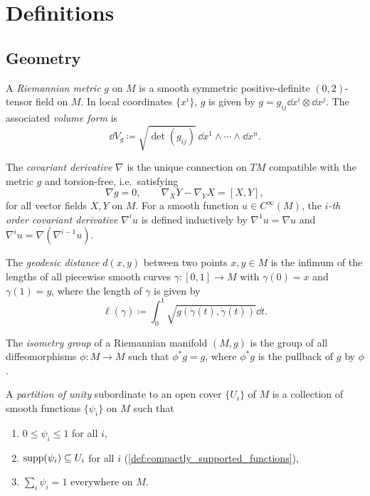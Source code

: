 \section{Definitions}

\subsection{Geometry}

\begin{definition}
  A \emph{Riemannian metric} $g$ on $M$ is a smooth symmetric positive-definite $(0,2)$-tensor field on $M$. In local coordinates $\{x^i\}$, $g$ is given by $g = g_{ij} \dd{x^i} \otimes \dd{x^j}$. The associated \emph{volume form} is
  \[%
    \dd{V}_g \coloneqq \sqrt{\det(g_{ij})} \, \dd{x^1} \wedge \cdots \wedge \dd{x^n}
  .\]%
\end{definition}

\begin{definition}
  The \emph{covariant derivative} $\nabla$ is the unique connection on $TM$ compatible with the metric $g$ and torsion-free, i.e.\ satisfying
  \[%
    \nabla g = 0, \qquad \nabla_X Y - \nabla_Y X = [X, Y]
  ,\]%
  for all vector fields $X, Y$ on $M$. For a smooth function $u \in C^\infty(M)$, the \emph{$i$-th order covariant derivative} $\nabla^i u$ is defined inductively by $\nabla^1 u = \nabla u$ and $\nabla^i u = \nabla(\nabla^{i-1} u)$.
\end{definition}

\begin{definition}
  The \emph{geodesic distance} $d(x, y)$ between two points $x, y \in M$ is the infimum of the lengths of all piecewise smooth curves $\gamma : [0, 1] \to M$ with $\gamma(0) = x$ and $\gamma(1) = y$, where the length of $\gamma$ is given by
  \[%
    \ell(\gamma) \coloneqq \int_0^1 \sqrt{g(\dot\gamma(t), \dot\gamma(t))} \dd{t}
  .\]%
\end{definition}

\begin{definition}
  The \emph{isometry group} of a Riemannian manifold $(M, g)$ is the group of all diffeomorphisms $\phi : M \to M$ such that $\phi^*g = g$, where $\phi^*g$ is the pullback of $g$ by $\phi$.
\end{definition}

\begin{definition}
  A \emph{partition of unity} subordinate to an open cover $\{U_i\}$ of $M$ is a collection of smooth functions $\{\psi_i\}$ on $M$ such that
  \begin{enumerate}
    \item $0 \le \psi_i \le 1$ for all $i$,
    \item $\operatorname{supp}(\psi_i) \subseteq U_i$ for all $i$ (\cref{def:compactly_supported_functions}),
    \item $\sum_i \psi_i = 1$ everywhere on $M$.
  \end{enumerate}
\end{definition}

